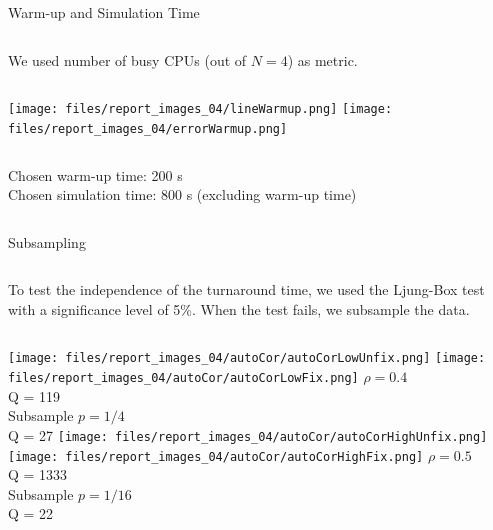 \documentclass[aspectratio=169,xcolor=dvipsnames]{beamer}
\begin{document}

\begin{frame}{Warm-up and Simulation Time}
    \begin{columns}[c]
        We used number of busy CPUs (out of $N = 4$) as metric.
    \end{columns}
    \begin{columns}[c] %
        \texttt{[image: files/report\_images\_04/lineWarmup.png]}
        \texttt{[image: files/report\_images\_04/errorWarmup.png]}
    \end{columns}
    \begin{columns}[c]
        \begin{block}{}
            Chosen warm-up time: 200 s\\
            Chosen simulation time: 800 s (excluding warm-up time)
        \end{block}
    \end{columns}
\end{frame}


\begin{frame}{Subsampling}
    \begin{columns}[c]
        To test the independence of the turnaround time, we used the Ljung-Box test with a significance level of 5\%.
        When the test fails, we subsample the data.
    \end{columns}
    \begin{columns}[c]
        \texttt{[image: files/report\_images\_04/autoCor/autoCorLowUnfix.png]}
        \texttt{[image: files/report\_images\_04/autoCor/autoCorLowFix.png]}
        $\rho=0.4$\\Q = 119\\
        \vspace{.35\textheight}
        Subsample $p=1/4$\\Q = 27
        \texttt{[image: files/report\_images\_04/autoCor/autoCorHighUnfix.png]}
        \texttt{[image: files/report\_images\_04/autoCor/autoCorHighFix.png]}
        $\rho=0.5$\\Q = 1333\\
        \vspace{.35\textheight}
        Subsample $p=1/16$\\Q = 22
    \end{columns}
\end{frame}
\end{document}
